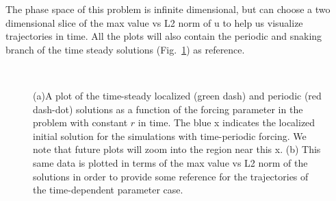 \documentclass[pre,preprint,superscriptaddress]{revtex4-1}
\begin{document}
The phase space of this problem is infinite dimensional, but can choose a two dimensional slice of the max value vs L2 norm of u to help us visualize trajectories in time.  All the plots will also contain the periodic and snaking branch of the time steady solutions (Fig.~\ref{fig:NormMaxBack}) as reference.  

\begin{figure}[h]
  \begin{center}
    \mbox{
       \quad
      }
    \caption{(a)A plot of the time-steady localized (green dash) and periodic (red dash-dot) solutions as a function of the forcing parameter in the problem with constant $r$ in time.  The blue x indicates the localized initial solution for the simulations with time-periodic forcing.  We note that future plots will zoom into the region near this x.  (b) This same data is plotted in terms of the max value vs L2 norm of the solutions in order to provide some reference for the trajectories of the time-dependent parameter case. }
    \label{fig:NormMaxBack}
  \end{center}
\end{figure} 
\end{document}
